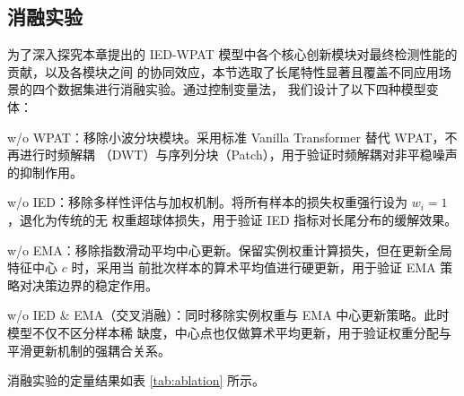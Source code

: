 \subsection{消融实验}

为了深入探究本章提出的 IED-WPAT 模型中各个核心创新模块对最终检测性能的贡献，以及各模块之间
的协同效应，本节选取了长尾特性显著且覆盖不同应用场景的四个数据集进行消融实验。通过控制变量法，
我们设计了以下四种模型变体：

w/o WPAT：移除小波分块模块。采用标准 Vanilla Transformer 替代 WPAT，不再进行时频解耦
（DWT）与序列分块（Patch），用于验证时频解耦对非平稳噪声的抑制作用。

w/o IED：移除多样性评估与加权机制。将所有样本的损失权重强行设为 $w_i = 1$，退化为传统的无
权重超球体损失，用于验证 IED 指标对长尾分布的缓解效果。

w/o EMA：移除指数滑动平均中心更新。保留实例权重计算损失，但在更新全局特征中心 $c$ 时，采用当
前批次样本的算术平均值进行硬更新，用于验证 EMA 策略对决策边界的稳定作用。

w/o IED \& EMA（交叉消融）：同时移除实例权重与 EMA 中心更新策略。此时模型不仅不区分样本稀
缺度，中心点也仅做算术平均更新，用于验证权重分配与平滑更新机制的强耦合关系。

消融实验的定量结果如表 \ref{tab:ablation} 所示。

\begin{table}[htbp]
\centering
\caption{IED-WPAT 模型各核心模块消融实验结果对比（F1-Score / AUC-ROC，单位：\%）}
\label{tab:ablation}
\end{table}

